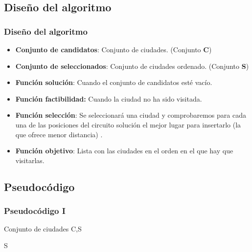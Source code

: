 \documentclass{beamer}
\begin{document}
\subsection{Diseño del algoritmo} 
\begin{frame}
	\frametitle{Diseño del algoritmo}
	\begin{itemize}
		\item \textbf{Conjunto de candidatos}: Conjunto de ciudades. (Conjunto \textbf{C})
		\item \textbf{Conjunto de seleccionados}: Conjunto de ciudades ordenado. (Conjunto \textbf{S})
		\item \textbf{Función solución}: Cuando el conjunto de candidatos esté vacío.
		\item \textbf{Función factibilidad:} Cuando la ciudad no ha sido visitada.
		\item \textbf{Función selección}: Se seleccionará una ciudad y comprobaremos para cada una de las posiciones del circuito solución el mejor lugar para insertarlo (la que ofrece menor distancia) .
		\item \textbf{Función objetivo}: Lista con las ciudades en el orden en el que hay que visitarlas.		
	\end{itemize}
	
\end{frame}

\subsection{Pseudocódigo}
\begin{frame}
	\frametitle{Pseudocódigo I}
			\begin{algorithmic}				
						\Require Conjunto de ciudades C,S
									\EndIf
								\EndFor
							\EndFor 
						\EndWhile 
						
						\Return S
					
			\end{algorithmic}

\end{frame}
\end{document}

